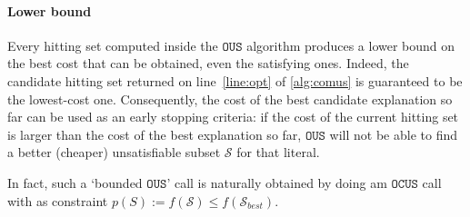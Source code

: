 \documentclass[twoside,11pt]{article}
\newcommand\m[1]{\mathcal{#1}}
\newcommand\comment[1]{\marginpar{\tiny #1}}
\renewcommand\comment[1]{#1}
\newcommand{\bart}[1]{{\comment{\color{OliveGreen}Bart: #1}}}
\newcommand\setstohit{\ensuremath{\m{H} }\xspace}
\newcommand\subsetT{\ensuremath{\m{S} }\xspace}
\newcommand\formula{\ensuremath{\m{F} }\xspace}
\newcommand\mm[1]{\ensuremath{#1}\xspace}
\newcommand\call[1]{\mm{\texttt{#1}}}
\newcommand\ohs{\mm{\call{OptHittingSet}}}
\newcommand\sat{\texttt{{SAT}}\xspace}
\newcommand\omus{\mm{\call{OUS}}}
\newcommand\comus{\mm{\call{OCUS}}}
\newcommand\ousb{\mm{\call{OCUS\_Bound}}}
\newcommand\corrsubsets{\mm{\call{CorrSubsets}}}
\begin{document}
\paragraph{Lower bound} Every hitting set computed inside the \omus{} algorithm produces a lower bound on the best cost that can be obtained, even the satisfying ones. Indeed, the candidate hitting set returned on line~\ref{line:opt} of \cref{alg:comus} is guaranteed to be the lowest-cost one. Consequently, the cost of the best candidate explanation so far can be used as an early stopping criteria: if the cost of the current hitting set is larger than the cost of the best explanation so far, \omus{} will not be able to find a better (cheaper) unsatisfiable subset $\m{S}$ for that literal.

In fact, such a `bounded \omus{}' call is naturally obtained by doing am \comus call with as constraint $p(S):= f(\m{S}) \leq f(\m{S}_{best})$.




\end{document}

